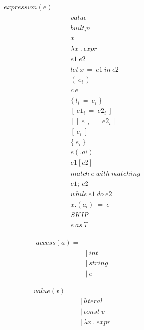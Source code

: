 \documentclass[10pt,a4paper]{article}
\begin{document}
\begin{align*}
expression(e) = 
\\
 \ &|\ value                       \ \tag{values}
\\
 \ &|\ built_in                    \ \tag{built-in\ function}
\\
 \ &|\ x                           \ \tag{variables}
\\
 \ &|\ \lambda x\ .\ expr                   \ \tag{lambda}
\\
 \ &|\ e1\ e2                       \ \tag{application}
\\
 \ &|\ let\ x\ =\ e1\ in\ e2            \ \tag{let\ in}
\\
 \ &|\ (\ e_i\ )                     \ \tag{tuple}
\\
 \ &|\ c\ e                         \ \tag{constructor}
\\
 \ &|\ \{\ l_i\ =\ e_i\ \}               \ \tag{record}
\\
 \ &|\ [\ e1_i\ =\ e2_i\ ]             \ \tag{map}
\\
 \ &|\ [[\ e1_i\ =\ e2_i\ ]]           \ \tag{big\ map}
\\
 \ &|\ [\ e_i\ ]                     \ \tag{list}
\\
 \ &|\ \{\ e_i\ \}                     \ \tag{set}
\\
 \ &|\ e(.ai)                      \ \tag{accessor}
\\
 \ &|\ e1[e2]                      \ \tag{look\ up}
\\
 \ &|\ match\ e\ with\ matching       \ \tag{matching}
\\
 \ &|\ e1;\ e2                      \ \tag{sequence}
\\
 \ &|\ while\ e1\ do\ e2              \ \tag{loop}
\\
 \ &|\ x.(a_i)\ =\ e                 \ \tag{assign}
\\
 \ &|\ SKIP                        \ \tag{skip}
\\
 \ &|\ e\ as\ T                      \ \tag{ascription}
\end{align*}

\begin{align*}
access(a) = 
\\
 \ &|\ int   \ \tag{for\ tuples}
\\
 \ &|\ string\ \tag{for\ record}
\\
 \ &|\ e     \ \tag{for\ map}
\end{align*}

\begin{align*}
value(v) = 
\\
 \ &|\ literal                     \ \tag{values\ of\ built-in\ types}
\\
 \ &|\ const\ v                     \ \tag{values\ of\ construct\ types}
\\
 \ &|\ \lambda x\ .\ expr                   \ \tag{lambda}
\end{align*}
\end{document}
